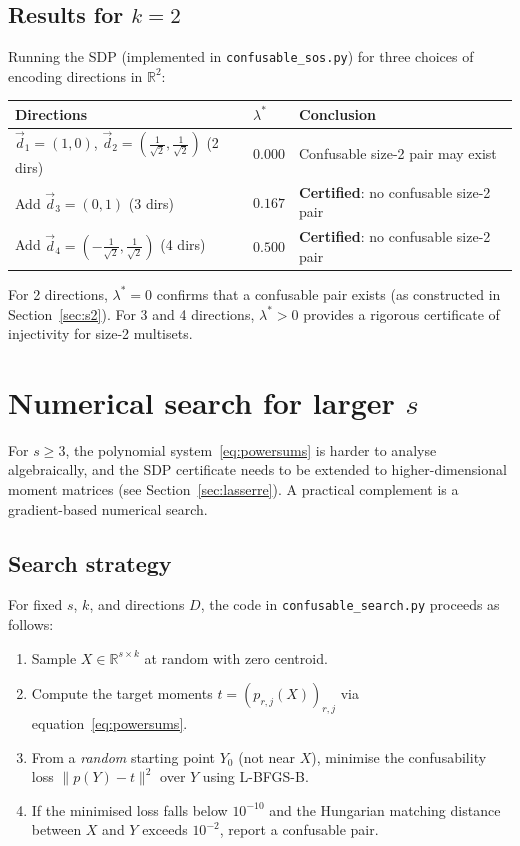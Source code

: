 \documentclass[12pt,a4paper]{article}
\begin{document}
\subsection*{Results for $k = 2$}

Running the SDP (implemented in \texttt{confusable\_sos.py}) for three
choices of encoding directions in $\mathbb{R}^2$:

\medskip
\begin{center}
\begin{tabular}{lll}
  \hline
  Directions & $\lambda^*$ & Conclusion \\
  \hline
  $\vec{d}_1 = (1,0)$,\; $\vec{d}_2 = (\frac{1}{\sqrt2}, \frac{1}{\sqrt2})$ (2 dirs)
    & $0.000$ & Confusable size-2 pair may exist \\
  Add $\vec{d}_3 = (0,1)$ (3 dirs)
    & $0.167$ & \textbf{Certified}: no confusable size-2 pair \\
  Add $\vec{d}_4 = (-\frac{1}{\sqrt2}, \frac{1}{\sqrt2})$ (4 dirs)
    & $0.500$ & \textbf{Certified}: no confusable size-2 pair \\
  \hline
\end{tabular}
\end{center}
\medskip

For 2 directions, $\lambda^* = 0$ confirms that a confusable pair
exists (as constructed in Section~\ref{sec:s2}).  For 3 and 4 directions,
$\lambda^* > 0$ provides a rigorous certificate of injectivity for
size-2 multisets.

\section{Numerical search for larger \texorpdfstring{$s$}{s}}
\label{sec:numerical}

For $s \geq 3$, the polynomial system~\eqref{eq:powersums} is harder to
analyse algebraically, and the SDP certificate needs to be extended to
higher-dimensional moment matrices (see Section~\ref{sec:lasserre}).
A practical complement is a gradient-based numerical search.

\subsection*{Search strategy}

For fixed $s$, $k$, and directions $D$, the code in
\texttt{confusable\_search.py} proceeds as follows:

\begin{enumerate}
  \item Sample $X \in \mathbb{R}^{s \times k}$ at random with zero
    centroid.
  \item Compute the target moments $t = (p_{r,j}(X))_{r,j}$ via
    equation~\eqref{eq:powersums}.
  \item From a \emph{random} starting point $Y_0$ (not near $X$),
    minimise the confusability loss $\|p(Y) - t\|^2$ over $Y$ using
    L-BFGS-B.
  \item If the minimised loss falls below $10^{-10}$ and the Hungarian
    matching distance between $X$ and $Y$ exceeds $10^{-2}$, report a
    confusable pair.
\end{enumerate}
\end{document}
